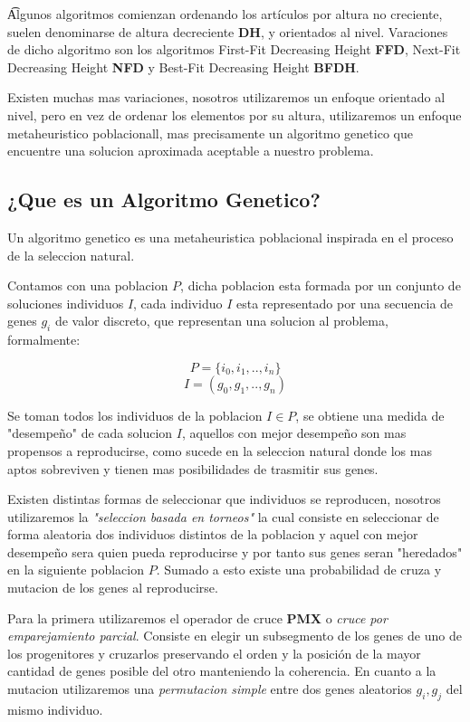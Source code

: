 \documentclass[10pt]{article}
\begin{document}
\t Algunos algoritmos comienzan ordenando los artículos por altura no creciente, suelen denominarse de altura decreciente \textbf{DH}, y orientados al nivel. Varaciones de dicho algoritmo son los algoritmos First-Fit Decreasing Height \textbf{FFD}, Next-Fit Decreasing Height \textbf{NFD} y Best-Fit Decreasing Height \textbf{BFDH}.

Existen muchas mas variaciones, nosotros utilizaremos un enfoque orientado al nivel, pero en vez de ordenar los elementos por su altura, utilizaremos un enfoque metaheuristico poblacionall, mas precisamente un algoritmo genetico que encuentre una solucion aproximada aceptable a nuestro problema.

\subsection{¿Que es un Algoritmo Genetico?}

Un algoritmo genetico es una metaheuristica poblacional inspirada en el proceso de la seleccion natural.

Contamos con una poblacion $P$, dicha poblacion esta formada por un conjunto de soluciones individuos $I$, cada individuo $I$ esta representado por una secuencia de genes $g_i$ de valor discreto, que representan una solucion al problema, formalmente:

$$P =\{i_0,i_1,..,i_n\}$$
$$I =(g_0,g_1,..,g_n)$$

Se toman todos los individuos de la poblacion $I \in P$, se obtiene una medida de "desempeño" de cada solucion $I$, aquellos con mejor desempeño son mas propensos a reproducirse, como sucede en la seleccion natural donde los mas aptos sobreviven y tienen mas posibilidades de trasmitir sus genes.

Existen distintas formas de seleccionar que individuos se reproducen, nosotros utilizaremos la \textit{"seleccion basada en torneos"} la cual consiste en seleccionar de forma aleatoria dos individuos distintos de la poblacion y aquel con mejor desempeño sera quien pueda reproducirse y por tanto sus genes seran "heredados" en la siguiente poblacion $P$. Sumado a esto existe una probabilidad de cruza y mutacion de los genes al reproducirse.

Para la primera utilizaremos el operador de cruce \textbf{PMX} o \textit{cruce por emparejamiento parcial}. Consiste en elegir un subsegmento de los genes de uno de los progenitores y cruzarlos preservando el orden y la posición de la mayor cantidad de genes posible del otro manteniendo la coherencia.
En cuanto a la mutacion utilizaremos una \textit{permutacion simple} entre dos genes aleatorios $g_i,g_j$ del mismo individuo.
\end{document}
